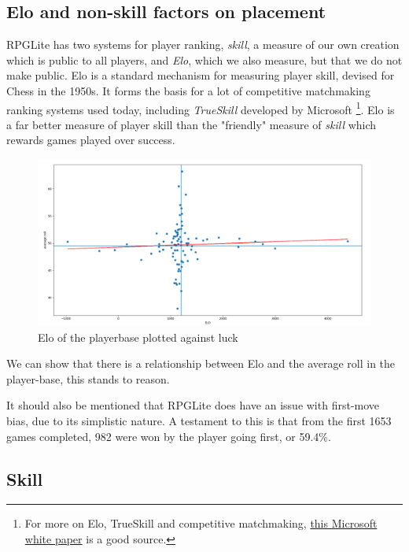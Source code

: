 \documentclass{tufte-handout}
\begin{document}
\subsection{Elo and non-skill factors on placement}

RPGLite has two systems for player ranking, \textit{skill}, a measure of our own creation which is public to all players, and \textit{Elo}, which we also measure, but that we do not make public. Elo is a standard mechanism for measuring player skill, devised for Chess in the 1950s. It forms the basis for a lot of competitive matchmaking ranking systems used today, including \textit{TrueSkill} developed by Microsoft \footnote{For more on Elo, TrueSkill and competitive matchmaking, \href{https://www.microsoft.com/en-us/research/wp-content/uploads/2006/10/Game-Developer-Feature-Article-Graepel-Herbrich.pdf}{this Microsoft white paper} is a good source.}. Elo is a far better measure of player skill than the "friendly" measure of \textit{skill} which rewards games played over success. 

\begin{figure}
    \centering
    \includegraphics{luck_over_Elo.png}
    \caption{Elo of the playerbase plotted against luck}
    \label{fig:luck-over-Elo}
\end{figure}

We can show that there is a relationship between Elo and the average roll in the player-base, this stands to reason.

It should also be mentioned that RPGLite does have an issue with first-move bias, due to its simplistic nature. A testament to this is that from the first 1653 games completed, 982 were won by the player going first, or 59.4\%.

\subsection{Skill}
\end{document}
